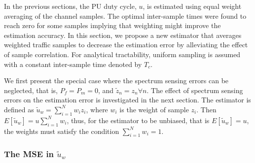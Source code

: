 \documentclass[11pt,draftclsnofoot,journal,onecolumn]{IEEEtran}
\begin{document}
In the previous sections, the PU duty cycle, $u$, is estimated using equal weight averaging of the channel samples. The optimal inter-sample times were found to reach zero for some samples implying that weighting might improve the estimation accuracy. In this section, we propose a new estimator that averages weighted traffic samples to decrease the estimation error by alleviating the effect of sample correlation. For analytical tractability, uniform sampling is assumed with a constant inter-sample time denoted by $T_c$.

We first present the special case where the spectrum sensing errors can be neglected, that is, $P_f = P_m = 0$, and $\tilde z_n = z_n \forall n$. The effect of spectrum sensing errors on the estimation error is investigated in the next section. The estimator is defined as $\tilde{u}_w=\sum\limits_{i=1}^{N}w_{i}z_i$, where $w_i$ is the weight of sample $z_i$. Then $E[\tilde{u}_w]=u\sum\limits_{i=1}^{N}w_{i}$, thus, for the estimator to be unbiased, that is $E[\tilde{u}_w]=u$, the weights must satisfy the condition $\sum\limits_{i=1}^{N}w_{i}=1$.

\subsubsection{The MSE in $\tilde{u}_w$}
\label{sec:mse_u_weight}
\end{document}
